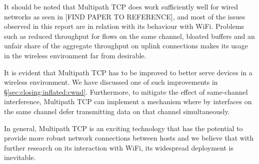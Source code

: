It should be noted that Multipath TCP does work sufficiently well for wired 
networks as seen in [FIND PAPER TO REFERENCE], and most of the issues observed 
in this report are in relation with its behaviour with WiFi. Problems such as 
reduced  throughput for flows on the same channel, bloated buffers and an unfair 
share of  the aggregate throughput on uplink connections makes its usage in the 
wireless environment far from desirable.

It is evident that Multipath TCP has to be improved to better serve devices in a
wireless environment. We have discussed one of such improvements in 
\S\ref{sec:closing:inflated:cwnd}. Furthermore, to mitigate the effect of 
same-channel interference, Multipath TCP can implement a mechanism where by 
interfaces on the same channel defer transmitting data on that channel 
simultaneously.

In general, Multipath TCP is an exciting technology that has the potential to 
provide more robust network connections between hosts and we believe that with 
further research on its interaction with WiFi, its widespread deployment is 
inevitable.

